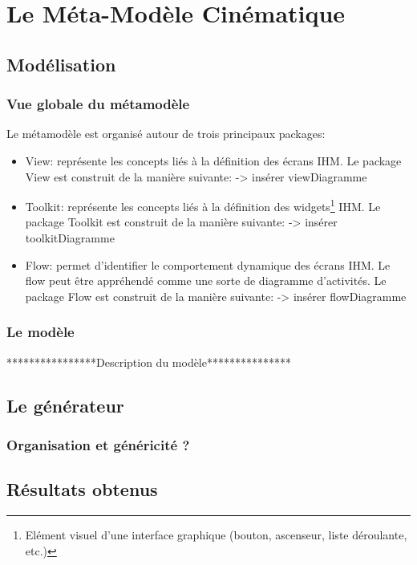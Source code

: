 \section{Le Méta-Modèle Cinématique}
\subsection{Modélisation}
\subsubsection{Vue globale du métamodèle}
Le métamodèle est organisé autour de trois principaux packages:
\begin{itemize}
  \item View: représente les concepts liés à la définition des écrans IHM.
Le package View est construit de la manière suivante:
\newline
-> insérer viewDiagramme
  \item Toolkit: représente les concepts liés à la définition des
  widgets\footnote{Elément visuel d'une interface graphique (bouton, ascenseur,
  liste déroulante, etc.)} IHM.
Le package Toolkit est construit de la manière suivante:
\newline
-> insérer toolkitDiagramme
  \item Flow: permet d'identifier le comportement dynamique des écrans IHM.
  Le flow peut être appréhendé comme une sorte de diagramme d'activités.
Le package Flow est construit de la manière suivante:
\newline
-> insérer flowDiagramme
\end{itemize}

\subsubsection{Le modèle}

****************Description du modèle***************

\subsection{Le générateur}
\subsubsection{Organisation et généricité ?}
\subsubsection{}
\subsection{Résultats obtenus}
